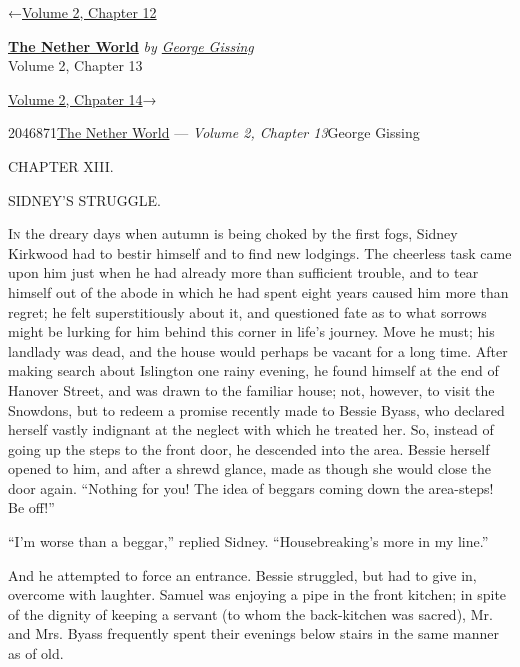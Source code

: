 \hypertarget{headerContainer}{}
\hypertarget{navigationHeader}{}
\protect\hypertarget{headerprevious}{}{←\href{/wiki/The_Nether_World/Volume_2/Chapter_12}{Volume
2, Chapter 12}}

\textbf{\protect\hypertarget{header_title_text}{}{\href{/wiki/The_Nether_World}{The
Nether World}}} \emph{by
\href{/wiki/Author:George_Gissing}{\protect\hypertarget{header_author_text}{}{{George
Gissing}}}}\\
\protect\hypertarget{header_section_text}{}{Volume 2, Chapter 13}

\protect\hypertarget{headernext}{}{\href{/wiki/The_Nether_World/Volume_2/Chapter_14}{Volume
2, Chpater 14}→}

\hypertarget{navigationNotes}{}

\hypertarget{ws-data}{}
\protect\hypertarget{ws-article-id}{}{2046871}\protect\hypertarget{ws-title}{}{\href{/wiki/The_Nether_World}{The
Nether World} --- \emph{Volume 2, Chapter
13}}\protect\hypertarget{ws-author}{}{George Gissing}

{\protect\hypertarget{266}{}{}}

{CHAPTER XIII.}

SIDNEY'S STRUGGLE.

\textsc{In} the dreary days when autumn is being choked by the first
fogs, Sidney Kirkwood had to bestir himself and to find new lodgings.
The cheerless task came upon him just when he had already more than
sufficient trouble, and to tear himself out of the abode in which he had
spent eight years caused him more than regret; he felt superstitiously
about it, and questioned fate as to what sorrows might be lurking for
him behind this corner in life's journey. Move he must; his landlady was
dead, and the house would perhaps be vacant for a long time. After
making search about Islington one rainy evening, he found himself at the
end of Hanover Street, and was drawn to the familiar house; not,
however, to visit the {\protect\hypertarget{267}{}{}}Snowdons, but to
redeem a promise recently made to Bessie Byass, who declared herself
vastly indignant at the neglect with which he treated her. So, instead
of going up the steps to the front door, he descended into the area.
Bessie herself opened to him, and after a shrewd glance, made as though
she would close the door again. ``Nothing for you! The idea of beggars
coming down the area-steps! Be off!''

``I'm worse than a beggar,'' replied Sidney. ``Housebreaking's more in
my line.''

And he attempted to force an entrance. Bessie struggled, but had to give
in, overcome with laughter. Samuel was enjoying a pipe in the front
kitchen; in spite of the dignity of keeping a servant (to whom the
back-kitchen was sacred), Mr. and Mrs. Byass frequently spent their
evenings below stairs in the same manner as of old.

